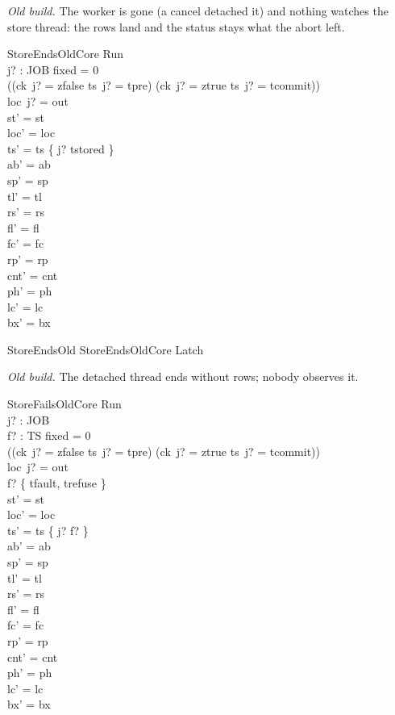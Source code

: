 \documentclass[a4paper,10pt,fleqn]{article}
\begin{document}
\emph{Old build.} The worker is gone (a cancel detached it) and nothing watches
the store thread: the rows land and the status stays what the abort left.

\begin{schema}{StoreEndsOldCore}
\Delta Run \\ j? : JOB
\where
fixed = 0 \\
((ck~j? = zfalse \land ts~j? = tpre) \lor (ck~j? = ztrue \land ts~j? = tcommit)) \\
loc~j? = out \\
st' = st \\
loc' = loc \\
ts' = ts \oplus \{ j? \mapsto tstored \} \\
ab' = ab \\
sp' = sp \\
tl' = tl \\
rs' = rs \\
fl' = fl \\
fc' = fc \\
rp' = rp \\
cnt' = cnt \\
ph' = ph \\
lc' = lc \\
bx' = bx
\end{schema}

\begin{zed}
StoreEndsOld  StoreEndsOldCore \land Latch
\end{zed}

\emph{Old build.} The detached thread ends without rows; nobody observes it.

\begin{schema}{StoreFailsOldCore}
\Delta Run \\ j? : JOB \\ f? : TS
\where
fixed = 0 \\
((ck~j? = zfalse \land ts~j? = tpre) \lor (ck~j? = ztrue \land ts~j? = tcommit)) \\
loc~j? = out \\
f? \in \{ tfault, trefuse \} \\
st' = st \\
loc' = loc \\
ts' = ts \oplus \{ j? \mapsto f? \} \\
ab' = ab \\
sp' = sp \\
tl' = tl \\
rs' = rs \\
fl' = fl \\
fc' = fc \\
rp' = rp \\
cnt' = cnt \\
ph' = ph \\
lc' = lc \\
bx' = bx
\end{schema}
\end{document}
